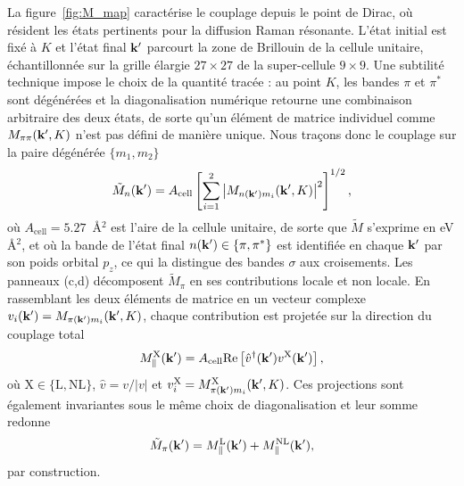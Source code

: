 La figure~\ref{fig:M_map} caractérise le couplage depuis le point de Dirac, où résident les états pertinents pour la diffusion Raman résonante. L'état initial est fixé à $K$ et l'état final $\mathbf{k}'$ parcourt la zone de Brillouin de la cellule unitaire, échantillonnée sur la grille élargie $27\times 27$ de la super-cellule $9\times 9$. Une subtilité technique impose le choix de la quantité tracée : au point $K$, les bandes $\pi$ et $\pi^*$ sont dégénérées et la diagonalisation numérique retourne une combinaison arbitraire des deux états, de sorte qu'un élément de matrice individuel comme $M_{\pi\pi}(\mathbf{k}',K)$ n'est pas défini de manière unique. Nous traçons donc le couplage sur la paire dégénérée $\{m_1,m_2\}$
\begin{equation}
    \tilde M_n(\mathbf{k}') = A_\text{cell}\left[\sum_{i=1}^2\left|M_{n(\mathbf{k}')m_i}(\mathbf{k}',K)\right|^2\right]^{1/2},\label{eqn:M_tilde}
\end{equation}
où $A_\text{cell} = 5.27$~\AA$^2$ est l'aire de la cellule unitaire, de sorte que $\tilde M$ s'exprime en eV\,\AA$^2$, et où la bande de l'état final $n(\mathbf{k}')\in\{\pi,\pi^*\}$ est identifiée en chaque $\mathbf{k}'$ par son poids orbital $p_z$, ce qui la distingue des bandes $\sigma$ aux croisements. Les panneaux (c,d) décomposent $\tilde M_\pi$ en ses contributions locale et non locale. En rassemblant les deux éléments de matrice en un vecteur complexe $v_i(\mathbf{k}') = M_{\pi(\mathbf{k}')m_i}(\mathbf{k}',K)$, chaque contribution est projetée sur la direction du couplage total
\begin{equation}
    M^\text{X}_\parallel(\mathbf{k}')= A_\text{cell}\mathrm{Re}\left[\hat v^\dagger(\mathbf{k}')v^\text{X}(\mathbf{k}')\right],\label{eqn:M_projection}
\end{equation}
où $\text{X}\in\{\text{L},\text{NL}\}$, $\hat v = v/|v|$ et $v_i^\text{X}= M^\text{X}_{\pi(\mathbf{k}')m_i}(\mathbf{k}',K)$. Ces projections sont également invariantes sous le même choix de diagonalisation et leur somme redonne
\begin{equation*}
    \tilde M_{\pi}(\mathbf{k}') = M^\text{L}_\parallel(\mathbf{k}') + M^\text{NL}_\parallel(\mathbf{k}'),
\end{equation*}
par construction.

